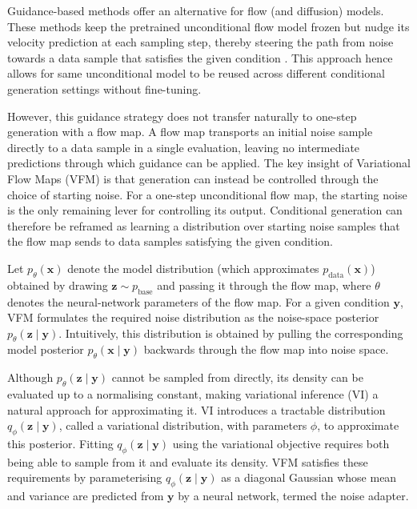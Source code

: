 \documentclass[12pt,a4paper]{report}
\begin{document}
Guidance-based methods offer an alternative for flow (and diffusion) models. These methods keep the pretrained unconditional flow model frozen but nudge its velocity prediction at each sampling step, thereby steering the path from noise towards a data sample that satisfies the given condition \parencite{chung2024diffusionposteriorsamplinggeneral,song2023pseudoinverseguided,Zhang_2025,kim2025flowdpsflowdrivenposteriorsampling}. This approach hence allows for same unconditional model to be reused across different conditional generation settings without fine-tuning.

However, this guidance strategy does not transfer naturally to one-step generation with a flow map. A flow map transports an initial noise sample directly to a data sample in a single evaluation, leaving no intermediate predictions through which guidance can be applied. The key insight of Variational Flow Maps (VFM) \parencite{VFM} is that generation can instead be controlled through the choice of starting noise. For a one-step unconditional flow map, the starting noise is the only remaining lever for controlling its output. Conditional generation can therefore be reframed as learning a distribution over starting noise samples that the flow map sends to data samples satisfying the given condition.

Let $p_{\theta}(\mathbf{x})$ denote the model distribution (which approximates $p_\text{data}(\mathbf{x})$) obtained by drawing $\mathbf{z}\sim p_{\mathrm{base}}$ and passing it through the flow map, where $\theta$ denotes the neural-network parameters of the flow map.
For a given condition $\mathbf{y}$, VFM formulates the required noise distribution as the noise-space posterior $p_{\theta}(\mathbf{z}\mid\mathbf{y})$.
Intuitively, this distribution is obtained by pulling the corresponding model posterior $p_{\theta}(\mathbf{x}\mid\mathbf{y})$ backwards through the flow map into noise space.


Although \(p_{\theta}(\mathbf{z}\mid\mathbf{y})\) cannot be sampled from directly, its density can be evaluated up to a normalising constant, making variational inference (VI) \parencite{Blei_2017} a natural approach for approximating it. VI introduces a tractable distribution \(q_{\phi}(\mathbf{z}\mid\mathbf{y})\), called a variational distribution, with parameters \(\phi\), to approximate this posterior.
Fitting \(q_{\phi}(\mathbf{z}\mid\mathbf{y})\) using the variational objective requires both being able to sample from it and evaluate its density. VFM satisfies these requirements by parameterising \(q_{\phi}(\mathbf{z}\mid\mathbf{y})\) as a diagonal Gaussian whose mean and variance are predicted from \(\mathbf{y}\) by a neural network, termed the noise adapter. 
\end{document}
